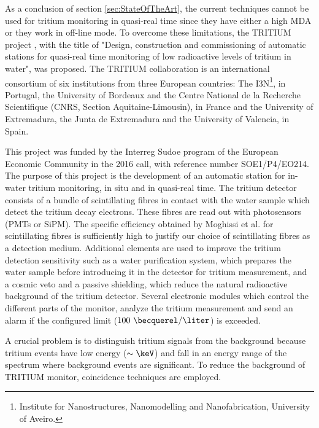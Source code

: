 As a conclusion of section \ref{sec:StateOfTheArt}, the current techniques cannot be used for tritium monitoring in quasi-real time since they have either a high MDA or they work in off-line mode. To overcome these limitations, the TRITIUM project \cite{TRITIUM}, with the title of "Design, construction and commissioning of automatic stations for quasi-real time monitoring of low radioactive levels of tritium in water", was proposed. The TRITIUM collaboration is an international consortium of six institutions from three European countries: The I3N\footnote{Institute for Nanostructures, Nanomodelling and Nanofabrication, University of Aveiro.}, in Portugal, the University of Bordeaux and the Centre National de la Recherche Scientifique (CNRS, Section Aquitaine-Limousin), in France and the University of Extremadura, the Junta de Extremadura and the University of Valencia, in Spain.

This project was funded by the Interreg Sudoe program of the European Economic Community in the 2016 call, with reference number SOE1/P4/EO214. The purpose of this project is the development of an automatic station for in-water tritium monitoring, in situ and in quasi-real time. The tritium detector consists of a bundle of scintillating fibres in contact with the water sample which detect the tritium decay electrons. These fibres are read out with photosensors (PMTs or SiPM). The specific efficiency obtained by Moghissi et al. for scintillating fibres is sufficiently high to justify our choice of scintillating fibres as a detection medium. Additional elements are used to improve the tritium detection sensitivity such as a water purification system, which prepares the water sample before introducing it in the detector for tritium measurement, and a cosmic veto and a passive shielding, which reduce the natural radioactive background of the tritium detector. Several electronic modules which control the different parts of the monitor, analyze the tritium measurement and send an alarm if the configured limit ($100~\becquerel/\liter$) is exceeded.

A crucial problem is to distinguish tritium signals from the background because tritium events have low energy ($\sim\keV$) and fall in an energy range of the spectrum where background events are significant. To reduce the background of TRITIUM monitor, coincidence techniques are employed.


